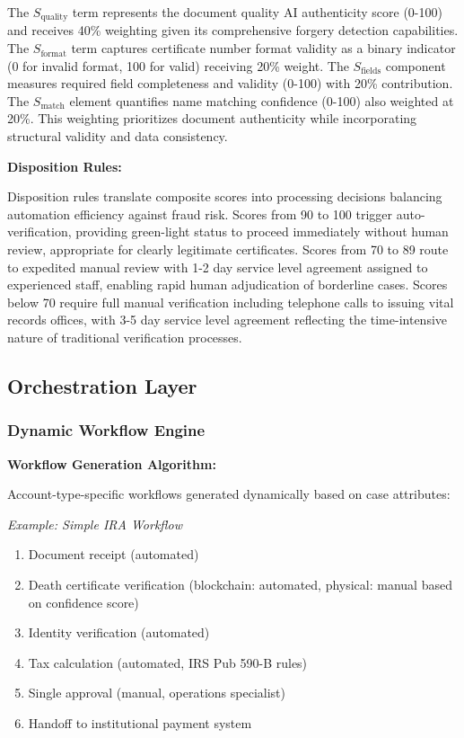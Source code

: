 The $S_{\text{quality}}$ term represents the document quality AI authenticity score (0-100) and receives 40\% weighting given its comprehensive forgery detection capabilities. The $S_{\text{format}}$ term captures certificate number format validity as a binary indicator (0 for invalid format, 100 for valid) receiving 20\% weight. The $S_{\text{fields}}$ component measures required field completeness and validity (0-100) with 20\% contribution. The $S_{\text{match}}$ element quantifies name matching confidence (0-100) also weighted at 20\%. This weighting prioritizes document authenticity while incorporating structural validity and data consistency.

\textbf{Disposition Rules:}

Disposition rules translate composite scores into processing decisions balancing automation efficiency against fraud risk. Scores from 90 to 100 trigger auto-verification, providing green-light status to proceed immediately without human review, appropriate for clearly legitimate certificates. Scores from 70 to 89 route to expedited manual review with 1-2 day service level agreement assigned to experienced staff, enabling rapid human adjudication of borderline cases. Scores below 70 require full manual verification including telephone calls to issuing vital records offices, with 3-5 day service level agreement reflecting the time-intensive nature of traditional verification processes.

\subsection{Orchestration Layer}

\subsubsection{Dynamic Workflow Engine}

\textbf{Workflow Generation Algorithm:}

Account-type-specific workflows generated dynamically based on case attributes:

\textit{Example: Simple IRA Workflow}
\begin{enumerate}
\item Document receipt (automated)
\item Death certificate verification (blockchain: automated, physical: manual based on confidence score)
\item Identity verification (automated)
\item Tax calculation (automated, IRS Pub 590-B rules)
\item Single approval (manual, operations specialist)
\item Handoff to institutional payment system
\end{enumerate}

